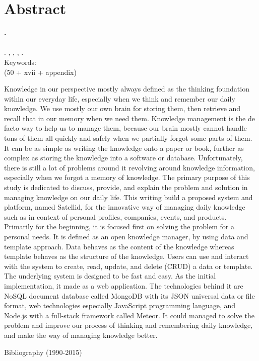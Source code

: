 
\begingroup
\let\clearpage\relax
\let\cleardoublepage\relax

\label{chap:abstract}
\chapter{Abstract}

\textbf{\myName.} \myNPM \\
\textbf{\myTitle} \\
\textbf{\myThesisType}. \myDepartmentLong, \myFacultyLong, \myUni, \myYear. \\
Keywords: \myKeywords \\
(50 + xvii + appendix)

\hfill

\singlespacing

Knowledge in our perspective mostly always defined as the thinking foundation within our everyday life,
especially when we think and remember our daily knowledge.
We use mostly our own brain for storing them, then retrieve and recall that in our memory when we need them.
Knowledge management is the de facto way to help us to manage them, because our brain mostly cannot handle tons of them all quickly and safely when we partially forgot some parts of them.
It can be as simple as writing the knowledge onto a paper or book, further as complex as storing the knowledge into a software or database.
Unfortunately, there is still a lot of problems around it revolving around knowledge information, especially when we forgot a memory of knowledge.
The primary purpose of this study is dedicated to discuss, provide, and explain the problem and solution in managing knowledge on our daily life.
This writing build a proposed system and platform, named Satellid, for the innovative way of managing daily knowledge
such as in context of personal profiles, companies, events, and products.
Primarily for the beginning, it is focused first on solving the problem for a personal needs.
It is defined as an open knowledge manager, by using data and template approach.
Data behaves as the content of the knowledge whereas template behaves as the structure of the knowledge.
Users can use and interact with the system to create, read, update, and delete (CRUD) a data or template.
The underlying system is designed to be fast and easy.
As the initial implementation, it made as a web application.
The technologies behind it are NoSQL document database called MongoDB with its JSON universal data or file format, web technologies especially JavaScript programming language, and Node.js with a full-stack framework called Meteor.
It could managed to solve the problem and improve our process of thinking and remembering daily knowledge, and make the way of managing knowledge better.

\onehalfspacing

\hfill


\noindent Bibliography (1990-2015)



\endgroup

\vfill
